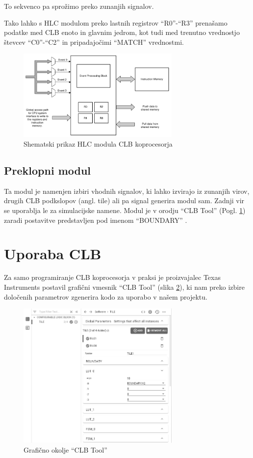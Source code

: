 \documentclass[a4paper]{article}
\begin{document}
\begin{sloppypar}
To sekvenco pa sprožimo preko zunanjih signalov.

Tako lahko s HLC modulom preko lastnih registrov
``R0''-``R3'' \cite[Pogl.~26.4.6]{mcu-ref-manual} prenašamo podatke med CLB
enoto in glavnim jedrom, kot tudi med trenutno vrednostjo števcev ``C0''-``C2''
in pripadajočimi ``MATCH'' vrednostmi.

\begin{figure}[htb]
    \centerline{\includegraphics[width=8cm]{shema_hlc}}
    \caption{Shematski prikaz HLC modula CLB koprocesorja
             \cite[Pogl.~26.4.6]{mcu-ref-manual}}
    \label{fig:hlc} 
\end{figure}

\subsection{Preklopni modul}
Ta modul je namenjen izbiri vhodnih signalov, ki lahko izvirajo iz zunanjih
virov, drugih CLB podkslopov (angl. tile) ali pa signal generira modul sam.
Zadnji vir se uporablja le za simulacijske namene. Modul je v orodju ``CLB
Tool'' (Pogl. \ref{sec:clb_tool}) zaradi postavitve predstavljen pod imenom
``BOUNDARY'' \cite[Pogl.~3.3]{clb-user-guide}.


\section{Uporaba CLB}\label{sec:clb_tool}
Za samo programiranje CLB koprocesorja v praksi je proizvajalec Texas
Instruments postavil grafični vmesnik ``CLB Tool'' (slika \ref{fig:clbtool}),
ki nam preko izbire določenih parametrov zgenerira kodo za uporabo v našem
projektu.

\begin{figure}[htb]
    \centerline{\includegraphics[width=8cm]{clbtool}}
    \caption{Grafično okolje ``CLB Tool''}
    \label{fig:clbtool} 
\end{figure} 


\end{sloppypar}
\end{document}
